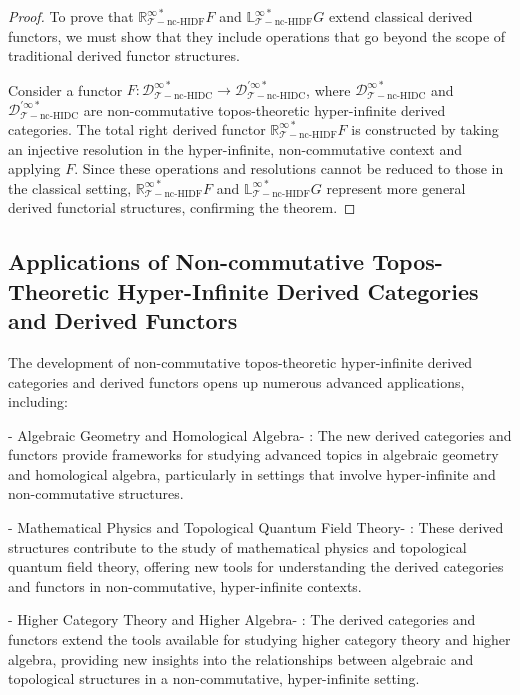 \documentclass{article}
\begin{document}
\begin{proof}
To prove that \(\mathbb{R}_{\mathcal{T}-\text{nc-HIDF}}^{\infty *}F\) and \(\mathbb{L}_{\mathcal{T}-\text{nc-HIDF}}^{\infty *}G\) extend classical derived functors, we must show that they include operations that go beyond the scope of traditional derived functor structures.

Consider a functor \(F: \mathcal{D}_{\mathcal{T}-\text{nc-HIDC}}^{\infty *} \to \mathcal{D}_{\mathcal{T}-\text{nc-HIDC}}^{\prime\infty *}\), where \(\mathcal{D}_{\mathcal{T}-\text{nc-HIDC}}^{\infty *}\) and \(\mathcal{D}_{\mathcal{T}-\text{nc-HIDC}}^{\prime\infty *}\) are non-commutative topos-theoretic hyper-infinite derived categories. The total right derived functor \(\mathbb{R}_{\mathcal{T}-\text{nc-HIDF}}^{\infty *}F\) is constructed by taking an injective resolution in the hyper-infinite, non-commutative context and applying \(F\). Since these operations and resolutions cannot be reduced to those in the classical setting, \(\mathbb{R}_{\mathcal{T}-\text{nc-HIDF}}^{\infty *}F\) and \(\mathbb{L}_{\mathcal{T}-\text{nc-HIDF}}^{\infty *}G\) represent more general derived functorial structures, confirming the theorem.
\end{proof}

\subsection{Applications of Non-commutative Topos-Theoretic Hyper-Infinite Derived Categories and Derived Functors}
The development of non-commutative topos-theoretic hyper-infinite derived categories and derived functors opens up numerous advanced applications, including:

-  Algebraic Geometry and Homological Algebra- : The new derived categories and functors provide frameworks for studying advanced topics in algebraic geometry and homological algebra, particularly in settings that involve hyper-infinite and non-commutative structures.

-  Mathematical Physics and Topological Quantum Field Theory- : These derived structures contribute to the study of mathematical physics and topological quantum field theory, offering new tools for understanding the derived categories and functors in non-commutative, hyper-infinite contexts.

-  Higher Category Theory and Higher Algebra- : The derived categories and functors extend the tools available for studying higher category theory and higher algebra, providing new insights into the relationships between algebraic and topological structures in a non-commutative, hyper-infinite setting.
\end{document}
